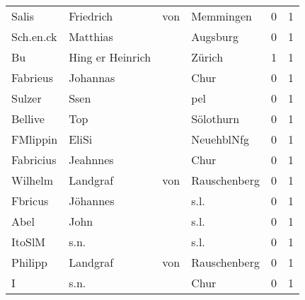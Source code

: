\begin{center}
\begin{tiny}
\begin{longtabu}{llllrr}
                    Salis &                          Friedrich &         von &                                   Memmingen &          0 &         1 \\
                Sch.en.ck &                           Matthias &             &                                    Augsburg &          0 &         1 \\
                       Bu &                   Hing er Heinrich &             &                                      Zürich &          1 &         1 \\
                 Fabrieus &                           Johannas &             &                                        Chur &          0 &         1 \\
                   Sulzer &                               Ssen &             &                                         pel &          0 &         1 \\
                  Bellive &                                Top &             &                                   Sölothurn &          0 &         1 \\
                 FMlippin &                              EliSi &             &                                  NeuehblNfg &          0 &         1 \\
                Fabricius &                           Jeahnnes &             &                                        Chur &          0 &         1 \\
                  Wilhelm &                           Landgraf &         von &                                Rauschenberg &          0 &         1 \\
                  Fbricus &                           Jöhannes &             &                                        s.l. &          0 &         1 \\
                     Abel &                               John &             &                                        s.l. &          0 &         1 \\
                   ItoSlM &                               s.n. &             &                                        s.l. &          0 &         1 \\
                  Philipp &                           Landgraf &         von &                                Rauschenberg &          0 &         1 \\
                        I &                               s.n. &             &                                        Chur &          0 &         1 \\

\end{longtabu}
\end{tiny}
\end{center}
